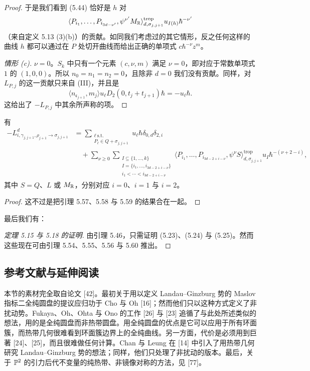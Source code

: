 \begin{proof}
于是我们看到 (5.44) 恰好是 $h$ 对
\[
  \langle P_{i_1},\ldots,P_{i_{3d-\nu'}},\psi^{\nu'}M_{\mathbb{R}}\rangle^{\mathrm{trop}}_{d,\sigma_{j,j+1}}u_{I(h)}\hbar^{-\nu'}
\]
（来自定义 5.13 (3)(b)）的贡献。如同我们考虑过的其它情形，反之任何这样的曲线 $h$ 都可以通过在 $P$ 处切开曲线而给出正确的单项式 $c\hbar^{-\nu}z^m$。

\textit{情形 (c).} $\nu=0$。$S_k$ 中只有一个元素 $(c,\nu,m)$ 满足 $\nu=0$，即对应于常数单项式 $1$ 的 $(1,0,0)$。所以 $n_0=n_1=n_2=0$，且除非 $d=0$ 我们没有贡献。同样，对 $L_{P,j}$ 的这一贡献只来自 (III)，并且是
\[
  \langle n_{\mathfrak c_{j+1}},m_j\rangle u_\ell D_2(0,t_j+t_{j+1})\hbar=-u_\ell\hbar.
\]
这给出了 $-L_{P,j}$ 中其余所声称的项。
\end{proof}

\begin{lemma}
有
\[
  \begin{aligned}
    -L^d_{i,\gamma_{j,j+1},\rho_{j+1}\to\sigma_{j,j+1}}
    &=\sum_{\substack{\ell\ \text{s.t.}\\ P_\ell\in Q+\sigma_{j,j+1}}}u_\ell\hbar\delta_{0,d}\delta_{2,i}\\
    &\quad+\sum_{\nu\ge0}\sum_{\substack{I\subseteq\{1,\ldots,k\}\\ I=\{i_1,\ldots,i_{3d-2+i-\nu}\}\\ i_1<\cdots<i_{3d-2+i-\nu}}}
      \langle P_{i_1},\ldots,P_{i_{3d-2+i-\nu}},\psi^\nu S\rangle^{\mathrm{trop}}_{d,\sigma_{j,j+1}}u_I\hbar^{-(\nu+2-i)},
  \end{aligned}
\]
其中 $S=Q$、$L$ 或 $M_{\mathbb{R}}$，分别对应 $i=0$、$i=1$ 与 $i=2$。
\end{lemma}

\begin{proof}
这不过是把引理 5.57、5.58 与 5.59 的结果合在一起。
\end{proof}

最后我们有：

\begin{proof}[定理 5.15 与 5.18 的证明]
由引理 5.46，只需证明 (5.23)、(5.24) 与 (5.25)。然而这些现在可由引理 5.54、5.55、5.56 与 5.60 推出。
\end{proof}

\subsection{参考文献与延伸阅读}

本节的素材完全取自论文 [42]。最初关于用以定义 Landau--Ginzburg 势的 Maslov 指标二全纯圆盘的提议应归功于 Cho 与 Oh [16]；然而他们只以这种方式定义了非扰动势。Fukaya、Oh、Ohta 与 Ono 的工作 [26] 与 [23] 追循了与此处所述类似的想法，用的是全纯圆盘而非热带圆盘。用全纯圆盘的优点是它可以应用于所有环面簇，而热带几何很难看到环面簇边界上的全纯曲线。另一方面，代价是必须用到巨著 [24]、[25]，而且很难做任何计算。Chan 与 Leung 在 [14] 中引入了用热带几何研究 Landau--Ginzburg 势的想法；同样，他们只处理了非扰动的版本。最后，关于 $\mathbb{P}^2$ 的引力后代不变量的纯热带、非镜像对称的方法，见 [77]。

